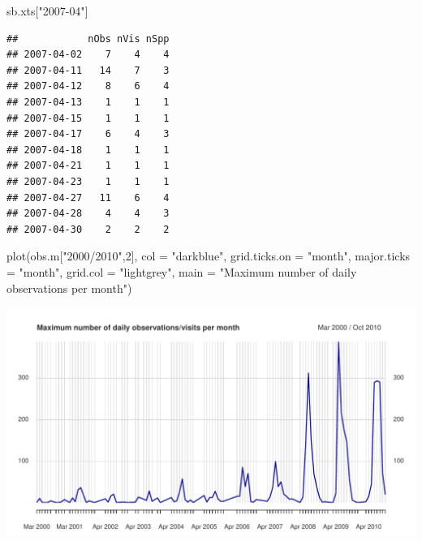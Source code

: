 \documentclass[
  10pt,
]{article}
\newenvironment{Shaded}{\begin{snugshade}}{\end{snugshade}}
\newcommand{\AttributeTok}[1]{\textcolor[rgb]{0.77,0.63,0.00}{#1}}
\newcommand{\DecValTok}[1]{\textcolor[rgb]{0.00,0.00,0.81}{#1}}
\newcommand{\FunctionTok}[1]{\textcolor[rgb]{0.00,0.00,0.00}{#1}}
\newcommand{\NormalTok}[1]{#1}
\newcommand{\OtherTok}[1]{\textcolor[rgb]{0.56,0.35,0.01}{#1}}
\newcommand{\SpecialCharTok}[1]{\textcolor[rgb]{0.00,0.00,0.00}{#1}}
\newcommand{\StringTok}[1]{\textcolor[rgb]{0.31,0.60,0.02}{#1}}
\begin{document}
\begin{Shaded}
\begin{Highlighting}[]
\NormalTok{sb.xts[}\StringTok{"2007{-}04"}\NormalTok{]}
\end{Highlighting}
\end{Shaded}

\begin{verbatim}
##            nObs nVis nSpp
## 2007-04-02    7    4    4
## 2007-04-11   14    7    3
## 2007-04-12    8    6    4
## 2007-04-13    1    1    1
## 2007-04-15    1    1    1
## 2007-04-17    6    4    3
## 2007-04-18    1    1    1
## 2007-04-21    1    1    1
## 2007-04-23    1    1    1
## 2007-04-27   11    6    4
## 2007-04-28    4    4    3
## 2007-04-30    2    2    2
\end{verbatim}

\begin{Shaded}
\begin{Highlighting}[]
\FunctionTok{plot}\NormalTok{(obs.m[}\StringTok{"2000/2010"}\NormalTok{,}\DecValTok{2}\NormalTok{], }\AttributeTok{col =} \StringTok{"darkblue"}\NormalTok{, }\AttributeTok{grid.ticks.on =} \StringTok{"month"}\NormalTok{, }
     \AttributeTok{major.ticks =} \StringTok{"month"}\NormalTok{, }\AttributeTok{grid.col =} \StringTok{"lightgrey"}\NormalTok{,  }
     \AttributeTok{main =} \StringTok{"Maximum number of daily observations per month"}\NormalTok{)}
\end{Highlighting}
\end{Shaded}

\includegraphics{r-tools-tutorial_files/figure-latex/monthly and plot-1.pdf}

\begin{Shaded}
\end{Shaded}
\end{document}
